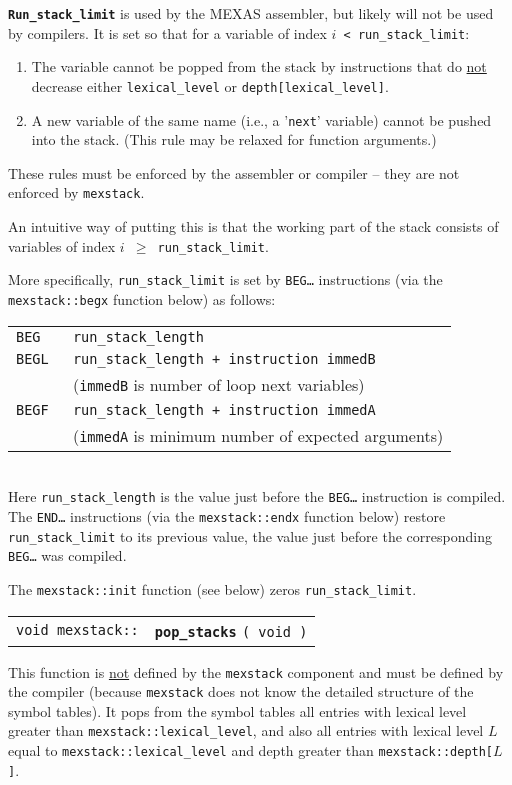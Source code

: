 \documentclass[12pt]{article}
\makeatletter
\newcommand{\TT}[1]{{\tt \bfseries #1}}
\newcommand{\ttindex}[1]{\index{#1@{\tt #1}}}
\newcommand{\EOL}{\penalty \exhyphenpenalty}
\newenvironment{indpar}[1][0.3in]%
	{\begin{list}{}%
		     {\setlength{\itemsep}{0in}%
		      \setlength{\topsep}{0in}%
		      \setlength{\parsep}{1ex}%
		      \setlength{\labelwidth}{#1}%
		      \setlength{\leftmargin}{#1}%
		      \addtolength{\leftmargin}{\labelsep}}%
	 \item}%
	{\end{list}}
\newcommand{\MEXSTACKKEY}[1]%
	   {\TT{#1}\ttindex{mexstack::#1}\ttindex{#1}}
\makeatother
\begin{document}
\begin{indpar}
\TT{Run\_stack\_limit} is used by the MEXAS assembler, but likely will not be
used by compilers.
It is set so that for a variable of index
{\tt $i$ < run\_stack\_limit}\label{RUN-STACK-LIMIT}:
\begin{enumerate}
\item The variable cannot be popped from the stack by instructions
that do \underline{not} decrease either {\tt lexical\_level} or
{\tt depth[lexical\_level]}.
\item A new variable of the same name (i.e., a '{\tt next}' variable)
cannot be pushed into the stack.  (This rule may be relaxed for
function arguments.)
\end{enumerate}

These rules must be enforced by the assembler or
compiler -- they are not enforced
by {\tt mexstack}.

An intuitive way of putting this is that the working part of the
stack consists of variables of index {\tt $i$ $\geq$ run\_stack\_limit}.

More specifically, {\tt run\_stack\_limit} is set by {\tt BEG\ldots}
instructions (via the {\tt mexstack::\EOL begx} function below) as follows: \\
\hspace*{3em}\begin{tabular}{@{}ll}
\tt BEG & \tt run\_stack\_length \\
\tt BEGL & \tt run\_stack\_length + {\rm instruction} immedB \\
         & ({\tt immedB} is number of loop next variables) \\
\tt BEGF & \tt run\_stack\_length + {\rm instruction} immedA \\
         & ({\tt immedA} is minimum number of expected arguments) \\
\end{tabular} \\
Here {\tt run\_stack\_length} is the value just before the {\tt BEG\ldots}
instruction is compiled.
The {\tt END\ldots} instructions (via the {\tt mexstack::endx} function below)
restore {\tt run\_\EOL stack\_\EOL limit} to its previous value, the value
just before the corresponding {\tt BEG\ldots} was compiled.

The {\tt mexstack::init} function (see below) zeros {\tt run\_stack\_limit}.
\end{indpar}

\begin{tabular}{@{}r@{~~~}l}
\verb|void mexstack::| & \MEXSTACKKEY{pop\_stacks} {\tt ( void )}
\end{tabular}
\begin{indpar}
This function is \underline{not} defined by the {\tt mexstack} component
and must be defined by the compiler (because {\tt mexstack} does not
know the detailed structure of the symbol tables).
It pops from the symbol
tables all entries with lexical level greater than
{\tt mexstack::\EOL lexical\_\EOL level}, and 
also all entries with lexical level $L$ equal to
{\tt mexstack::\EOL lexical\_\EOL level} and 
depth greater than {\tt mexstack::\EOL depth[$L$]}.
\end{indpar}
\end{document}
